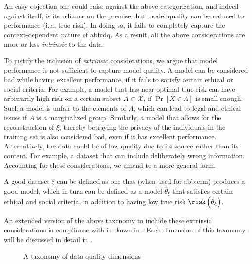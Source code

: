 An easy objection one could raise against the above categorization,
and indeed against  itself,
is its reliance on the premise that model quality
can be reduced to performance (i.e., true risk).
In doing so, it fails to completely capture
the context-dependent nature of \gls{abb:dq}.
As a result, all the above considerations
are more or less \emph{intrinsic} to the data.

To justify the inclusion of \emph{extrinsic} considerations,
we argue that model performance is not sufficient to capture model quality.
A model can be considered bad while having excellent performance,
if it fails to satisfy certain ethical or social criteria.
For example, a model that has near-optimal true risk
can have arbitrarily high risk on a certain subset \(A \subset \mathcal{X}\),
if \(\Pr{\left[X \in A \right]}\) is small enough.
Such a model is unfair to the elements of \(A\),
which can lead to legal and ethical issues if \(A\) is a marginalized group.
Similarly, a model that allows for the reconstruction of \(\xi\),
thereby betraying the privacy of the individuals in the training set
is also considered bad, even if it has excellent performance.
Alternatively, the data could be of low quality
due to its source rather than its content.
For example, a dataset that can include deliberately wrong information.
Accounting for these considerations, we amend 
to a more general form.
\begin{principle}\label{princple:mq_is_dq}
	A good dataset \(\xi\) can be defined as one that (when used for \gls{abb:erm})
	produces a good model, which in turn can be defined
	as a model \(\hat{\theta}_{\xi}\) that satisfies certain ethical and social criteria,
	in addition to having low true risk \(\risk\left( \hat{\theta}_{\xi} \right)\).
\end{principle}
An extended version of the above taxonomy to include these extrinsic considerations
in compliance with  is shown in .
Each dimension of this taxonomy will be discussed in detail in  .


\begin{figure}[hbt]
	\begin{center}
	\end{center}
	\caption{A taxonomy of data quality dimensions}
	\label{fig:dq:dims:taxonomy}
\end{figure}

